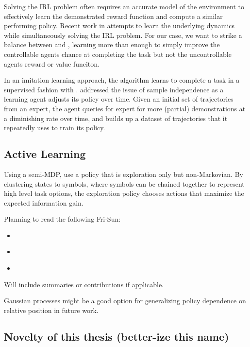     Solving the IRL problem often requires an accurate model of the environment to effectively learn the demonstrated
    reward function and compute a similar performing policy. Recent work in \cite{herman2016inverse} attempts to learn
    the underlying dynamics while simultaneously solving the IRL problem. For our case, we want to strike a balance
    between \cite{bandyopadhyay2013intention} and \cite{herman2016inverse}, learning more than enough to simply improve
    the controllable agents chance at completing the task but not the uncontrollable agents reward or value funciton.

    In an imitation learning approach, the \DAGGER algorithm learns to complete a task in a supervised fashion with
    \cite{ross2011reduction}. \DAGGER addressed the issue of sample independence as a learning agent adjusts its policy
    over time.  Given an initial set of trajectories from an expert, the agent queries for expert for more (partial)
    demonstrations at a diminishing rate over time, and builds up a dataset of trajectories that it repeatedly uses to
    train its policy.

\subsection{Active Learning}


    Using a semi-MDP,  \cite{andersen2017active} use a policy that is exploration only but non-Markovian.  By clustering
    states to symbols, where symbols can be chained together to represent high level task options, the exploration
    policy chooses actions that maximize the expected information gain.

    Planning to read the following Fri-Sun:
    \begin{itemize}
        \item \cite{khamassi2017active}
        \item \cite{andersson2017deep}
        \item \cite{martinez2007active}
    \end{itemize}
    Will include summaries or contributions if applicable.


    Gaussian processes might be a good option for generalizing policy dependence on relative position in future work.

\subsection{Novelty of this thesis (better-ize this name)}\label{sec:literature_novelty}

